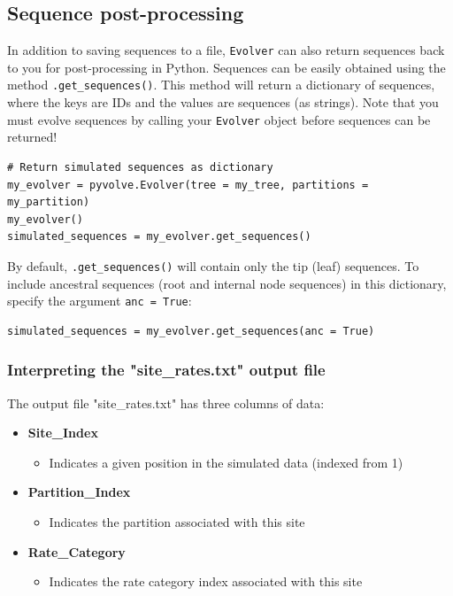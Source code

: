 \documentclass{article}
\newcommand{\code}[1]{\texttt{\small{#1}}}
\begin{document}
\subsection{Sequence post-processing}

In addition to saving sequences to a file, \code{Evolver} can also return sequences back to you for post-processing in Python. Sequences can be easily obtained using the method \code{.get\_sequences()}. This method will return a dictionary of sequences, where the keys are IDs and the values are sequences (as strings). Note that you must evolve sequences by calling your \code{Evolver} object before sequences can be returned!
\begin{lstlisting}
# Return simulated sequences as dictionary
my_evolver = pyvolve.Evolver(tree = my_tree, partitions = my_partition)
my_evolver()
simulated_sequences = my_evolver.get_sequences()
\end{lstlisting}

By default, \code{.get\_sequences()} will contain only the tip (leaf) sequences. To include ancestral sequences (root and internal node sequences) in this dictionary, specify the argument \code{anc = True}:
\begin{lstlisting}
simulated_sequences = my_evolver.get_sequences(anc = True)
\end{lstlisting}

\subsubsection{Interpreting the "site\_rates.txt" output file}\label{sec:ratefile}
The output file "site\_rates.txt" has three columns of data:
\begin{itemize}
	\item \textbf{Site\_Index}
	\begin{itemize}
		\item Indicates a given position in the simulated data (indexed from 1)
	\end{itemize}
	\item \textbf{Partition\_Index}
	\begin{itemize}
		\item Indicates the partition associated with this site
	\end{itemize}
	\item \textbf{Rate\_Category}
	\begin{itemize}
		\item Indicates the rate category index associated with this site
	\end{itemize}
\end{itemize}
\end{document}
